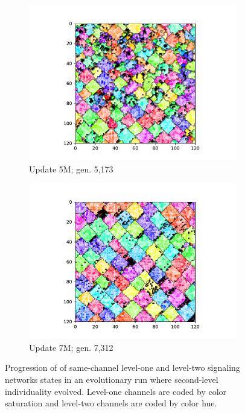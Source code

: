 \begin{figure}[!htbp]
\begin{center}
\begin{subfigure}[b]{0.5\columnwidth}
  \includegraphics[width=\columnwidth,trim={2.5cm 0.5cm 2.5cm 1cm},clip]{img/ChannelMap_1011_update5000000}
  \caption{Update 5M; gen. 5,173}
  \label{fig:ChannelMap_1011_update5000000}
\end{subfigure}%
\begin{subfigure}[b]{0.5\columnwidth}
  \includegraphics[width=\columnwidth,trim={2.5cm 0.5cm 2.5cm 1cm},clip]{img/ChannelMap_1011_update7000000}
  \caption{Update 7M; gen. 7,312}
  \label{fig:ChannelMap_1011_update7000000}
\end{subfigure}
\caption{
Progression of of same-channel level-one and level-two signaling networks states in an evolutionary run where second-level individuality evolved.
Level-one channels are coded by color saturation and level-two channels are coded by color hue.
}
\label{fig:grid_progression}
\end{center}
\end{figure}
